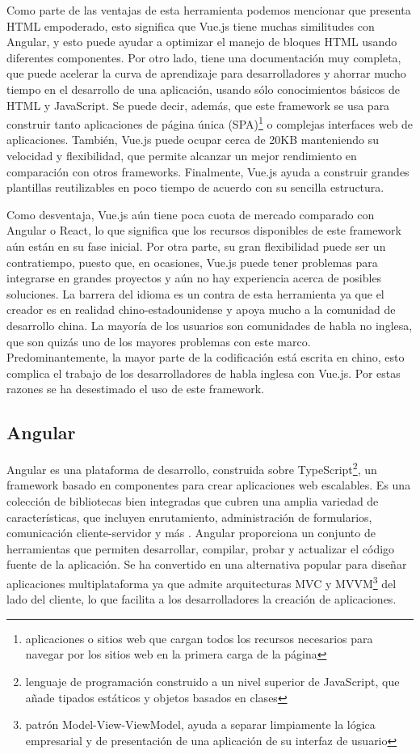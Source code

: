 Como parte de las ventajas de esta herramienta podemos mencionar que presenta HTML empoderado, esto significa que Vue.js tiene muchas similitudes con Angular, y esto puede ayudar a optimizar el manejo de bloques HTML usando diferentes componentes. Por otro lado, tiene una documentaci\'on muy completa, que puede acelerar la curva de aprendizaje para desarrolladores y ahorrar mucho tiempo en el desarrollo de una aplicaci\'on, usando s\'olo conocimientos b\'asicos de HTML y JavaScript. Se puede decir, adem\'as, que este framework se usa para construir tanto aplicaciones de p\'agina \'unica (SPA)\footnote{aplicaciones o sitios web que cargan todos los recursos necesarios para navegar por los sitios web en la primera carga de la p\'agina} o complejas interfaces web de aplicaciones. Tambi\'en, Vue.js puede ocupar cerca de 20KB manteniendo su velocidad y flexibilidad, que permite alcanzar un mejor rendimiento en comparaci\'on con otros frameworks. Finalmente, Vue.js ayuda a construir grandes plantillas reutilizables en poco tiempo de acuerdo con su sencilla estructura.

Como desventaja, Vue.js a\'un tiene poca cuota de mercado comparado con Angular o React, lo que significa que los recursos disponibles de este framework a\'un est\'an en su fase inicial. Por otra parte, su gran flexibilidad puede ser un contratiempo, puesto que, en ocasiones, Vue.js puede tener problemas para integrarse en grandes proyectos y a\'un no hay experiencia acerca de posibles soluciones. La barrera del idioma es un contra de esta herramienta ya que el creador es en realidad chino-estadounidense y apoya mucho a la comunidad de desarrollo china. La mayor\'ia de los usuarios son comunidades de habla no inglesa, que son quiz\'as uno de los mayores problemas con este marco. Predominantemente, la mayor parte de la codificaci\'on est\'a escrita en chino, esto complica el trabajo de los desarrolladores de habla inglesa con Vue.js. Por estas razones se ha desestimado el uso de este framework.


\subsection{Angular}
Angular es una plataforma de desarrollo, construida sobre TypeScript\footnote{lenguaje de programaci\'on construido a un nivel superior de JavaScript, que a\~nade tipados est\'aticos y objetos basados en clases}, un framework basado en componentes para crear aplicaciones web escalables. Es una colecci\'on de bibliotecas bien integradas que cubren una amplia variedad de caracter\'isticas, que incluyen enrutamiento, administraci\'on de formularios, comunicaci\'on cliente-servidor y m\'as \cite{angular}. Angular proporciona un conjunto de herramientas que permiten desarrollar, compilar, probar y actualizar el c\'odigo fuente de la aplicaci\'on. Se ha convertido en una alternativa popular para dise\~nar aplicaciones multiplataforma ya que admite arquitecturas MVC y MVVM\footnote{patr\'on Model-View-ViewModel, ayuda a separar limpiamente la l\'ogica empresarial y de presentaci\'on de una aplicaci\'on de su interfaz de usuario} del lado del cliente, lo que facilita a los desarrolladores la creaci\'on de aplicaciones.

